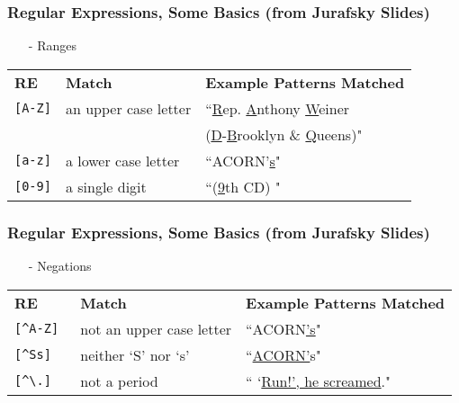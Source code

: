 \documentclass{beamer}
\numberwithin{equation}{section}
\begin{document}
\begin{frame}
\frametitle{Regular Expressions, Some Basics (from Jurafsky Slides) }
\begin{itemize}
\item[-] Ranges
\end{itemize}
\begin{center}
\begin{tabular} {lll}
\textbf{RE} & \textbf{Match} & \textbf{Example Patterns Matched}\\
{\tt [A-Z]}  & an upper case letter   & ``\underline{R}ep. \underline{A}nthony \underline{W}einer\\
  &    &   (\underline{D}-\underline{B}rooklyn \& \underline{Q}ueens)" \\
{\tt [a-z]}  & a lower case letter &   ``ACORN'\underline{s}" \\
{\tt [0-9]}  & a single digit  & ``(\underline{9}th CD) "
\end{tabular}
\end{center}
\end{frame}



\begin{frame}
\frametitle{Regular Expressions, Some Basics (from Jurafsky Slides) }
\begin{itemize}
\item[-] Negations
\end{itemize}
\begin{center}
\begin{tabular}{lll}
\textbf{RE} & \textbf{Match} & \textbf{Example Patterns Matched}\\
{\tt [\^{}A-Z] } & not an upper case letter &  ``ACORN\alert{\underline{'}\underline{s}}" \\
{\tt[\^{}Ss] } & neither `S' nor `s' & ``\alert{\underline{ACORN'}}s" \\
{\tt[\^{}\textbackslash.] } & not a period & `` `\underline{Run!', he screamed}." \\
\end{tabular}
\end{center}
\end{frame}
\end{document}
